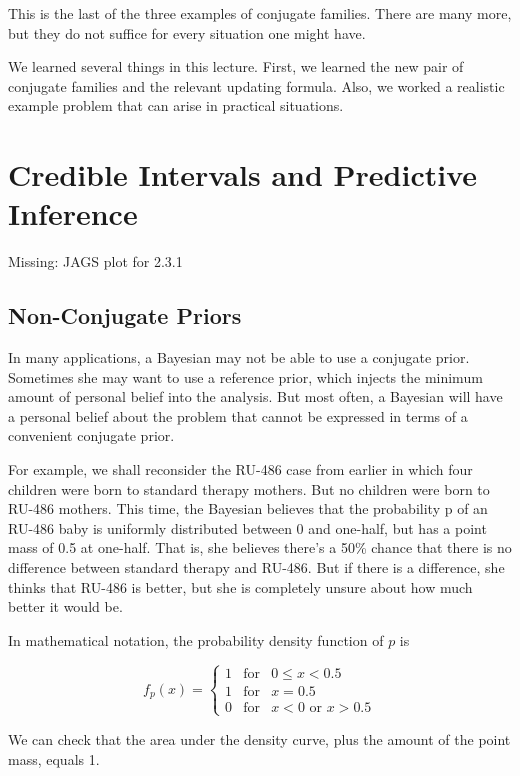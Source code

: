 \documentclass[]{book}
\theoremstyle{definition}
\theoremstyle{definition}
\theoremstyle{remark}
\begin{document}
This is the last of the three examples of conjugate families. There are
many more, but they do not suffice for every situation one might have.

We learned several things in this lecture. First, we learned the new
pair of conjugate families and the relevant updating formula. Also, we
worked a realistic example problem that can arise in practical
situations.

\section{Credible Intervals and Predictive
Inference}\label{credible-intervals-and-predictive-inference}

Missing: JAGS plot for 2.3.1

\subsection{Non-Conjugate Priors}\label{non-conjugate-priors}

In many applications, a Bayesian may not be able to use a conjugate
prior. Sometimes she may want to use a reference prior, which injects
the minimum amount of personal belief into the analysis. But most often,
a Bayesian will have a personal belief about the problem that cannot be
expressed in terms of a convenient conjugate prior.

For example, we shall reconsider the RU-486 case from earlier in which
four children were born to standard therapy mothers. But no children
were born to RU-486 mothers. This time, the Bayesian believes that the
probability p of an RU-486 baby is uniformly distributed between 0 and
one-half, but has a point mass of 0.5 at one-half. That is, she believes
there's a 50\% chance that there is no difference between standard
therapy and RU-486. But if there is a difference, she thinks that RU-486
is better, but she is completely unsure about how much better it would
be.

In mathematical notation, the probability density function of \(p\) is

\[f_p(x) = \left\{ \begin{array}{ccc}
1 & \text{for} & 0 \leq x < 0.5 \\
1 & \text{for} & x = 0.5 \\
0 & \text{for} & x < 0 \text{ or } x > 0.5
\end{array}\right.\]

We can check that the area under the density curve, plus the amount of
the point mass, equals 1.
\end{document}
